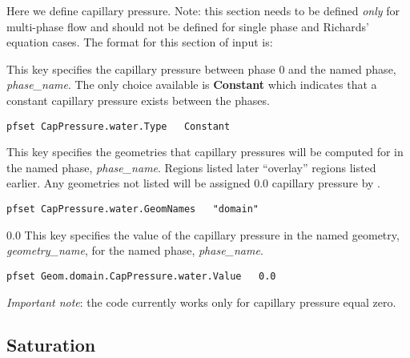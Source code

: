 Here we define capillary pressure.
Note: this section needs to be defined {\em only} for multi-phase flow
and should not be defined for single phase and Richards' equation cases.
The format for this section of input is:

{
This key specifies the capillary pressure between phase $0$ and the named
phase, {\em phase\_name}. The only choice available is {\bf Constant}
which indicates that a constant capillary pressure exists between the
phases.
}
\begin{display}\begin{verbatim}
pfset CapPressure.water.Type   Constant
\end{verbatim}\end{display}

{
This key specifies the geometries that capillary pressures will be
computed for in the named phase, {\em phase\_name}.  Regions listed
later ``overlay'' regions listed earlier.  Any geometries not listed
will be assigned $0.0$ capillary pressure by \parflow{}.
}
\begin{display}\begin{verbatim}
pfset CapPressure.water.GeomNames   "domain"
\end{verbatim}\end{display}


{0.0}
{
This key specifies the value of the capillary pressure in the named
geometry, {\em geometry\_name}, for the named phase, {\em phase\_name}.
}
\begin{display}\begin{verbatim}
pfset Geom.domain.CapPressure.water.Value   0.0
\end{verbatim}\end{display}


{\sl Important note}: the code currently works only for capillary
pressure equal zero.



\subsection{Saturation}
\label{Saturation}

